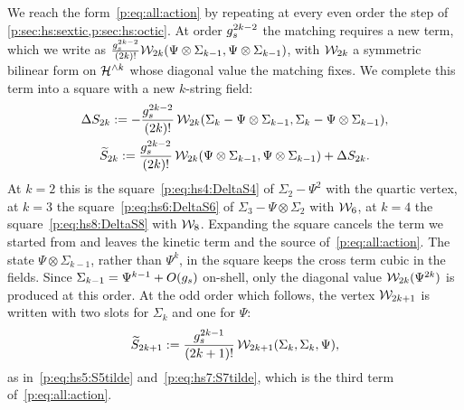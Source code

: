 We reach the form~\eqref{p:eq:all:action} by repeating at every even order the step of \cref{p:sec:hs:sextic,p:sec:hs:octic}.
At order $\gs^{2 k - 2}$ the matching requires a new term, which we write as $\tfrac{\gs^{2 k - 2}}{(2 k)!} \dvertex{2 k}(\Psi \otimes \Sigma_{k - 1}, \Psi \otimes \Sigma_{k - 1})$, with $\dvertex{2 k}$ a symmetric bilinear form on $\Hn{k}$ whose diagonal value the matching fixes.
We complete this term into a square with a new $k$-string field:
\begin{equation}
  \label{p:eq:all:square}
  \begin{gathered}
    \Delta S_{2 k}
      := - \frac{\gs^{2 k - 2}}{(2 k)!} \, \dvertex{2 k}(\Sigma_k - \Psi \otimes \Sigma_{k - 1}, \Sigma_k - \Psi \otimes \Sigma_{k - 1}),
    \\
    \caction[2 k]
      := \frac{\gs^{2 k - 2}}{(2 k)!} \, \dvertex{2 k}(\Psi \otimes \Sigma_{k - 1}, \Psi \otimes \Sigma_{k - 1}) + \Delta S_{2 k}.
  \end{gathered}
\end{equation}
At $k = 2$ this is the square~\eqref{p:eq:hs4:DeltaS4} of $\Sigma_2 - \Psi^2$ with the quartic vertex, at $k = 3$ the square~\eqref{p:eq:hs6:DeltaS6} of $\Sigma_3 - \Psi \otimes \Sigma_2$ with $\dvertex{6}$, at $k = 4$ the square~\eqref{p:eq:hs8:DeltaS8} with $\dvertex{8}$.
Expanding the square cancels the term we started from and leaves the kinetic term and the source of~\eqref{p:eq:all:action}.
The state $\Psi \otimes \Sigma_{k - 1}$, rather than $\Psi^k$, in the square keeps the cross term cubic in the fields.
Since $\Sigma_{k - 1} = \Psi^{k - 1} + O(\gs)$ on-shell, only the diagonal value $\dvertex{2 k}(\Psi^{2 k})$ is produced at this order.
At the odd order which follows, the vertex $\dvertex{2 k + 1}$ is written with two slots for $\Sigma_k$ and one for $\Psi$:
\begin{equation}
  \label{p:eq:all:odd}
  \caction[2 k + 1]
    := \frac{\gs^{2 k - 1}}{(2 k + 1)!} \, \dvertex{2 k + 1}(\Sigma_k, \Sigma_k, \Psi),
\end{equation}
as in~\eqref{p:eq:hs5:S5tilde} and~\eqref{p:eq:hs7:S7tilde}, which is the third term of~\eqref{p:eq:all:action}.

